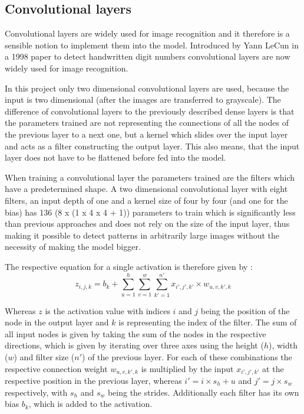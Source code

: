 \subsection{Convolutional layers}

Convolutional layers are widely used for image recognition and it therefore is a sensible notion to implement them into the model.
Introduced by Yann LeCun in a 1998 paper \cite{LeCun1998} to detect handwritten digit numbers convolutional layers are now widely used for image recognition.

In this project only two dimensional convolutional layers are used, because the input is two dimensional (after the images are transferred to grayscale).
The difference of convolutional layers to the previously described dense layers is that the parameters trained are not representing the connections of all the nodes of the previous layer to a next one, but a kernel which slides over the input layer and acts as a filter constructing the output layer.
This also means, that the input layer does not have to be flattened before fed into the model.

When training a convolutional layer the parameters trained are the filters which have a predetermined shape.
A two dimensional convolutional layer with eight filters, an input depth of one  and a kernel size of four by four (and one for the bias) has 136 (8 x (1 x 4 x 4 + 1)) parameters to train which is significantly less than previous approaches and does not rely on the size of the input layer, thus making it possible to detect patterns in arbitrarily large images without the necessity of making the model bigger.

The respective equation for a single activation is therefore given by \cite[p. 453]{Geron2019}:
\begin{equation}
z_{i,j,k} = b_k + \sum_{u=1}^{h} \sum_{v=1}^{w} \sum_{k'=1}^{n'} x_{i', j', k'} \times w_{u, v, k', k} 
\end{equation}

Whereas $z$ is the activation value with indices $i$ and $j$ being the position of the node in the output layer and $k$ is representing the index of the filter.
The sum of all input nodes is given by taking the sum of the nodes in the respective directions, which is given by iterating over three axes using the height ($h$), width ($w$) and filter size ($n'$) of the previous layer.
For each of these combinations the respective connection weight $w_{u, v, k', k}$ is multiplied by the input $x_{i', j', k'}$ at the respective position in the previous layer, whereas $i' = i \times s_h + u$ and $j' = j \times s_w$ respectively, with $s_h$ and $s_w$ being the strides.
Additionally each filter has its own bias $b_k$, which is added to the activation.

